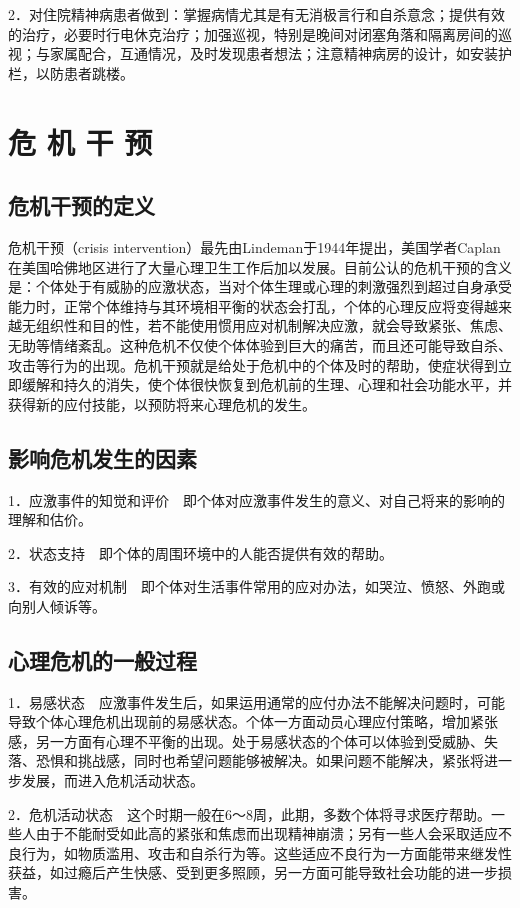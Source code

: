 2．对住院精神病患者做到：掌握病情尤其是有无消极言行和自杀意念；提供有效的治疗，必要时行电休克治疗；加强巡视，特别是晚间对闭塞角落和隔离房间的巡视；与家属配合，互通情况，及时发现患者想法；注意精神病房的设计，如安装护栏，以防患者跳楼。

\section{危 机 干 预}

\subsection{危机干预的定义}

危机干预（crisis
intervention）最先由Lindeman于1944年提出，美国学者Caplan在美国哈佛地区进行了大量心理卫生工作后加以发展。目前公认的危机干预的含义是：个体处于有威胁的应激状态，当对个体生理或心理的刺激强烈到超过自身承受能力时，正常个体维持与其环境相平衡的状态会打乱，个体的心理反应将变得越来越无组织性和目的性，若不能使用惯用应对机制解决应激，就会导致紧张、焦虑、无助等情绪紊乱。这种危机不仅使个体体验到巨大的痛苦，而且还可能导致自杀、攻击等行为的出现。危机干预就是给处于危机中的个体及时的帮助，使症状得到立即缓解和持久的消失，使个体很快恢复到危机前的生理、心理和社会功能水平，并获得新的应付技能，以预防将来心理危机的发生。

\subsection{影响危机发生的因素}

1．应激事件的知觉和评价　即个体对应激事件发生的意义、对自己将来的影响的理解和估价。

2．状态支持　即个体的周围环境中的人能否提供有效的帮助。

3．有效的应对机制　即个体对生活事件常用的应对办法，如哭泣、愤怒、外跑或向别人倾诉等。

\subsection{心理危机的一般过程}

1．易感状态　应激事件发生后，如果运用通常的应付办法不能解决问题时，可能导致个体心理危机出现前的易感状态。个体一方面动员心理应付策略，增加紧张感，另一方面有心理不平衡的出现。处于易感状态的个体可以体验到受威胁、失落、恐惧和挑战感，同时也希望问题能够被解决。如果问题不能解决，紧张将进一步发展，而进入危机活动状态。

2．危机活动状态　这个时期一般在6～8周，此期，多数个体将寻求医疗帮助。一些人由于不能耐受如此高的紧张和焦虑而出现精神崩溃；另有一些人会采取适应不良行为，如物质滥用、攻击和自杀行为等。这些适应不良行为一方面能带来继发性获益，如过瘾后产生快感、受到更多照顾，另一方面可能导致社会功能的进一步损害。


